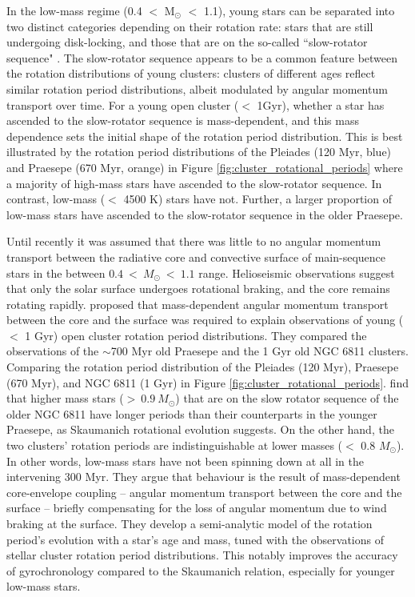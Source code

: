 In the low-mass regime (0.4 $<$ M$_{\odot}$ $<$ 1.1), young stars can be separated into two distinct categories depending on their rotation rate: stars that are still undergoing disk-locking, and those that are on the so-called ``slow-rotator sequence" \citep[see, e.g.,][]{lanzafame_rotational_2015}.
The slow-rotator sequence appears to be a common feature between the rotation distributions of young clusters: clusters of different ages reflect similar rotation period distributions, albeit modulated by angular momentum transport over time.
For a young open cluster ($<$ 1Gyr), whether a star has ascended to the slow-rotator sequence is mass-dependent, and this mass dependence sets the initial shape of the rotation period distribution.
This is best illustrated by the rotation period distributions of the Pleiades (120 Myr, blue) and Praesepe (670 Myr, orange) in Figure \ref{fig:cluster_rotational_periods} where a majority of high-mass stars have ascended to the slow-rotator sequence.
In contrast, low-mass ($<$ 4500 K) stars have not.
Further, a larger proportion of low-mass stars have ascended to the slow-rotator sequence in the older Praesepe.

Until recently it was assumed that there was little to no angular momentum transport between the radiative core and convective surface of main-sequence stars in the between $0.4 \ < \ M_{\odot} \ < \ 1.1$ range. 
Helioseismic observations suggest that only the solar surface undergoes rotational braking, and the core remains rotating rapidly.
\citet{spada_competing_2020} proposed that mass-dependent angular momentum transport between the core and the surface was required to explain observations of young ($<$ 1 Gyr) open cluster rotation period distributions.
They compared the observations of the $\sim$700 Myr old Praesepe and the 1 Gyr old NGC 6811 clusters.
Comparing the rotation period distribution of the Pleiades (120 Myr), Praesepe (670 Myr), and NGC 6811 (1 Gyr) in Figure \ref{fig:cluster_rotational_periods}. \citet{spada_competing_2020} find that higher mass stars (${>\ 0.9 \ M_{\odot}}$) that are on the slow rotator sequence of the older NGC 6811 have longer periods than their counterparts in the younger Praesepe, as Skaumanich rotational evolution suggests.
On the other hand, the two clusters' rotation periods are indistinguishable at lower masses ($<$ 0.8 $M_{\odot}$).
In other words, low-mass stars have not been spinning down at all in the intervening 300 Myr. 
They argue that behaviour is the result of mass-dependent core-envelope coupling -- angular momentum transport between the core and the surface -- briefly compensating for the loss of angular momentum due to wind braking at the surface.
They develop a semi-analytic model of the rotation period's evolution with a star's age and mass, tuned with the observations of stellar cluster rotation period distributions.
This notably improves the accuracy of gyrochronology compared to the Skaumanich relation, especially for younger low-mass stars.

